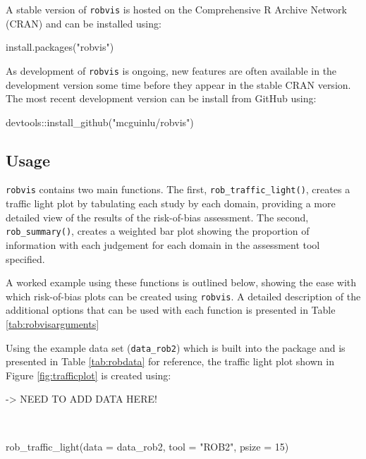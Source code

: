 \documentclass[a4paper, twoside]{templates/ociamthesis}
\newenvironment{Shaded}{\begin{snugshade}}{\end{snugshade}}
\newcommand{\AttributeTok}[1]{\textcolor[rgb]{0.77,0.63,0.00}{#1}}
\newcommand{\DecValTok}[1]{\textcolor[rgb]{0.00,0.00,0.81}{#1}}
\newcommand{\FunctionTok}[1]{\textcolor[rgb]{0.00,0.00,0.00}{#1}}
\newcommand{\NormalTok}[1]{#1}
\newcommand{\SpecialCharTok}[1]{\textcolor[rgb]{0.00,0.00,0.00}{#1}}
\newcommand{\StringTok}[1]{\textcolor[rgb]{0.31,0.60,0.02}{#1}}
\renewenvironment{Shaded}
{
  \vspace{4pt}%
  \begin{snugshade}%
}{%
  \end{snugshade}%
  \vspace{4pt}%
}
\begin{document}
A stable version of \texttt{robvis} is hosted on the Comprehensive R Archive Network (CRAN) and can be installed using:

\begin{Shaded}
\begin{Highlighting}[]
\FunctionTok{install.packages}\NormalTok{(}\StringTok{"robvis"}\NormalTok{)}
\end{Highlighting}
\end{Shaded}

As development of \texttt{robvis} is ongoing, new features are often available in the development version some time before they appear in the stable CRAN version. The most recent development version can be install from GitHub using:

\begin{Shaded}
\begin{Highlighting}[]
\NormalTok{devtools}\SpecialCharTok{::}\FunctionTok{install\_github}\NormalTok{(}\StringTok{"mcguinlu/robvis"}\NormalTok{)}
\end{Highlighting}
\end{Shaded}

\hypertarget{usage-1}{%
\subsection{Usage}\label{usage-1}}

\texttt{robvis} contains two main functions. The first, \texttt{rob\_traffic\_light()}, creates a traffic light plot by tabulating each study by each domain, providing a more detailed view of the results of the risk-of-bias assessment. The second, \texttt{rob\_summary()}, creates a weighted bar plot showing the proportion of information with each judgement for each domain in the assessment tool specified.

A worked example using these functions is outlined below, showing the ease with which risk-of-bias plots can be created using \texttt{robvis}. A detailed description of the additional options that can be used with each function is presented in Table \ref{tab:robvisarguments}

Using the example data set (\texttt{data\_rob2}) which is built into the package and is presented in Table \ref{tab:robdata} for reference, the traffic light plot shown in Figure \ref{fig:trafficplot} is created using:

-\textgreater{} NEED TO ADD DATA HERE!

~

\begin{Shaded}
\begin{Highlighting}[]
\FunctionTok{rob\_traffic\_light}\NormalTok{(}\AttributeTok{data =}\NormalTok{ data\_rob2,}
                  \AttributeTok{tool =} \StringTok{"ROB2"}\NormalTok{,}
                  \AttributeTok{psize =} \DecValTok{15}\NormalTok{)}
\end{Highlighting}
\end{Shaded}
\end{document}
